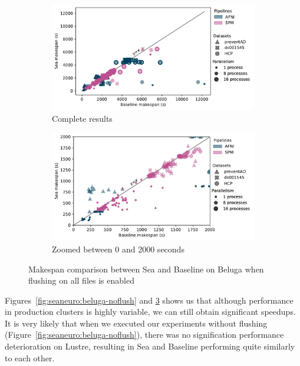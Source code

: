\begin{figure}
\begin{subfigure}{\textwidth}
    \centering
    \captionsetup{width=.85\linewidth}
    \includegraphics[width=\columnwidth]{figures/sea-neuro/beluga_withflush_nozoom.pdf}%
    \caption{Complete results}\label{fig:seaneuro:belugafullwf}
\end{subfigure}
\begin{subfigure}{\textwidth}
    \centering
    \captionsetup{width=.85\linewidth}
    \includegraphics[width=\linewidth]{figures/sea-neuro/beluga_withflush_zoom.pdf}
    \caption{Zoomed between 0 and 2000 seconds}\label{fig:seaneuro:belugazoomwf}
\end{subfigure}
\caption{Makespan comparison between Sea and Baseline on Beluga when flushing on all files is enabled}
\label{fig:seaneuro:beluga-wflush}
\end{figure}

  Figures~\ref{fig:seaneuro:beluga-noflush} and \ref{fig:seaneuro:beluga-wflush}
  shows us that although performance in production clusters is highly variable, we can
  still obtain significant speedups. It is very likely that when we executed our experiments
  without flushing (Figure~\ref{fig:seaneuro:beluga-noflush}), there was no signification performance
  deterioration on Lustre, resulting in Sea and Baseline performing quite similarly to each other.
  
